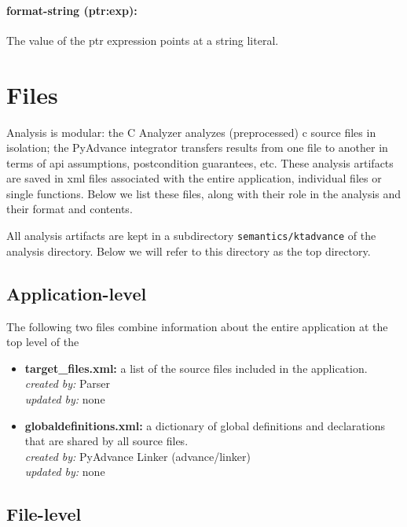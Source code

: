 \documentclass[11pt]{article}
\begin{document}
\paragraph{format-string (ptr:exp): }
The value of the ptr expression points at a string literal.


\section{Files}

Analysis is modular: the C Analyzer analyzes (preprocessed) c source files
in isolation; the PyAdvance integrator transfers results from one file to
another in terms of api assumptions, postcondition guarantees, etc. These
analysis artifacts are saved in xml files associated with the entire
application, individual files or single functions.
Below we list these files, along with their role in the analysis and their
format and contents.

All analysis artifacts are kept in a subdirectory {\tt semantics/ktadvance}
of the analysis directory.
Below we will refer to this directory as the top directory.

\subsection{Application-level}

The following two files combine information about the entire application
at the top level of the 

\begin{itemize}[leftmargin=*]
\item {\bf target\_files.xml: } a list of the source files included in the
  application. \\
  \emph{created by:} Parser \\
  \emph{updated by:} none
\item {\bf globaldefinitions.xml:} a dictionary of global definitions and declarations
  that are shared by all source files. \\
  \emph{created by:} PyAdvance Linker  (advance/linker) \\
  \emph{updated by:} none
\end{itemize}

\subsection{File-level}
\end{document}
